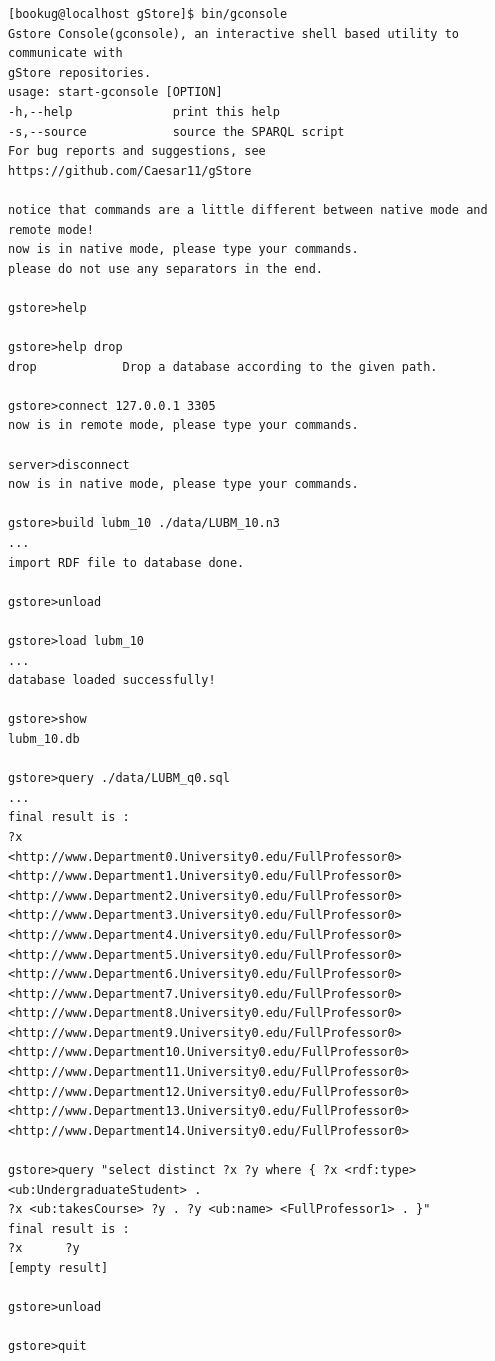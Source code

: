 \documentclass[titlepage, a4paper, 12pt]{article}
\begin{document}
\begin{verbatim}
[bookug@localhost gStore]$ bin/gconsole
Gstore Console(gconsole), an interactive shell based utility to communicate with
gStore repositories.
usage: start-gconsole [OPTION]
-h,--help              print this help
-s,--source            source the SPARQL script
For bug reports and suggestions, see https://github.com/Caesar11/gStore

notice that commands are a little different between native mode and remote mode!
now is in native mode, please type your commands.
please do not use any separators in the end.

gstore>help

gstore>help drop
drop            Drop a database according to the given path.

gstore>connect 127.0.0.1 3305
now is in remote mode, please type your commands.

server>disconnect
now is in native mode, please type your commands.

gstore>build lubm_10 ./data/LUBM_10.n3
...
import RDF file to database done.

gstore>unload

gstore>load lubm_10
...
database loaded successfully!

gstore>show
lubm_10.db

gstore>query ./data/LUBM_q0.sql
...
final result is :
?x
<http://www.Department0.University0.edu/FullProfessor0>
<http://www.Department1.University0.edu/FullProfessor0>
<http://www.Department2.University0.edu/FullProfessor0>
<http://www.Department3.University0.edu/FullProfessor0>
<http://www.Department4.University0.edu/FullProfessor0>
<http://www.Department5.University0.edu/FullProfessor0>
<http://www.Department6.University0.edu/FullProfessor0>
<http://www.Department7.University0.edu/FullProfessor0>
<http://www.Department8.University0.edu/FullProfessor0>
<http://www.Department9.University0.edu/FullProfessor0>
<http://www.Department10.University0.edu/FullProfessor0>
<http://www.Department11.University0.edu/FullProfessor0>
<http://www.Department12.University0.edu/FullProfessor0>
<http://www.Department13.University0.edu/FullProfessor0>
<http://www.Department14.University0.edu/FullProfessor0>

gstore>query "select distinct ?x ?y where { ?x <rdf:type>
<ub:UndergraduateStudent> .
?x <ub:takesCourse> ?y . ?y <ub:name> <FullProfessor1> . }"
final result is :
?x      ?y
[empty result]

gstore>unload

gstore>quit
\end{verbatim}
\end{document}
